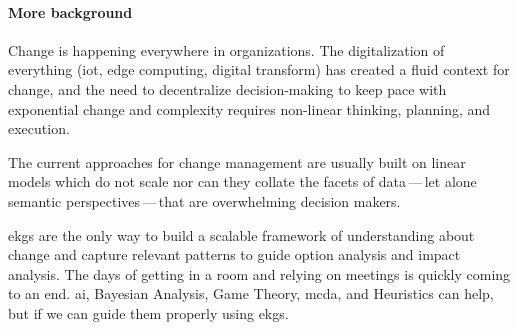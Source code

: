 %
%



\paragraph*{More background}

Change is happening everywhere in organizations.
The digitalization of everything (\acrshort{iot}, edge computing,
digital transform) has created a fluid context for change,
and the need to decentralize decision-making to keep pace with exponential change and complexity
requires non-linear thinking, planning, and execution.

The current approaches for change management are usually built on linear models which do not scale nor can they collate
the facets of data\,---\,let alone semantic perspectives\,---\,that are overwhelming decision makers.

\Glspl{ekg} are the only way to build a scalable framework of understanding about change and capture relevant patterns
to guide option analysis and impact analysis.
The days of getting in a room and relying on meetings is quickly coming to an end.
\Gls{ai}, Bayesian Analysis, Game Theory, \gls{mcda},
and Heuristics can help, but  if we can guide them properly using \glspl{ekg}.

